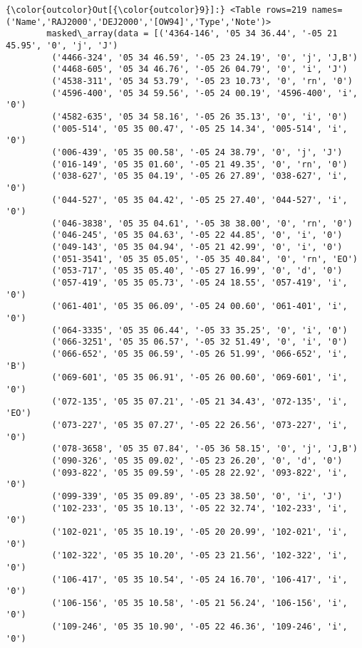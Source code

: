 \documentclass{article}
\begin{document}
            \begin{Verbatim}[commandchars=\\\{\}]
{\color{outcolor}Out[{\color{outcolor}9}]:} <Table rows=219 names=('Name','RAJ2000','DEJ2000','[OW94]','Type','Note')>
        masked\_array(data = [('4364-146', '05 34 36.44', '-05 21 45.95', '0', 'j', 'J')
         ('4466-324', '05 34 46.59', '-05 23 24.19', '0', 'j', 'J,B')
         ('4468-605', '05 34 46.76', '-05 26 04.79', '0', 'i', 'J')
         ('4538-311', '05 34 53.79', '-05 23 10.73', '0', 'rn', '0')
         ('4596-400', '05 34 59.56', '-05 24 00.19', '4596-400', 'i', '0')
         ('4582-635', '05 34 58.16', '-05 26 35.13', '0', 'i', '0')
         ('005-514', '05 35 00.47', '-05 25 14.34', '005-514', 'i', '0')
         ('006-439', '05 35 00.58', '-05 24 38.79', '0', 'j', 'J')
         ('016-149', '05 35 01.60', '-05 21 49.35', '0', 'rn', '0')
         ('038-627', '05 35 04.19', '-05 26 27.89', '038-627', 'i', '0')
         ('044-527', '05 35 04.42', '-05 25 27.40', '044-527', 'i', '0')
         ('046-3838', '05 35 04.61', '-05 38 38.00', '0', 'rn', '0')
         ('046-245', '05 35 04.63', '-05 22 44.85', '0', 'i', '0')
         ('049-143', '05 35 04.94', '-05 21 42.99', '0', 'i', '0')
         ('051-3541', '05 35 05.05', '-05 35 40.84', '0', 'rn', 'EO')
         ('053-717', '05 35 05.40', '-05 27 16.99', '0', 'd', '0')
         ('057-419', '05 35 05.73', '-05 24 18.55', '057-419', 'i', '0')
         ('061-401', '05 35 06.09', '-05 24 00.60', '061-401', 'i', '0')
         ('064-3335', '05 35 06.44', '-05 33 35.25', '0', 'i', '0')
         ('066-3251', '05 35 06.57', '-05 32 51.49', '0', 'i', '0')
         ('066-652', '05 35 06.59', '-05 26 51.99', '066-652', 'i', 'B')
         ('069-601', '05 35 06.91', '-05 26 00.60', '069-601', 'i', '0')
         ('072-135', '05 35 07.21', '-05 21 34.43', '072-135', 'i', 'EO')
         ('073-227', '05 35 07.27', '-05 22 26.56', '073-227', 'i', '0')
         ('078-3658', '05 35 07.84', '-05 36 58.15', '0', 'j', 'J,B')
         ('090-326', '05 35 09.02', '-05 23 26.20', '0', 'd', '0')
         ('093-822', '05 35 09.59', '-05 28 22.92', '093-822', 'i', '0')
         ('099-339', '05 35 09.89', '-05 23 38.50', '0', 'i', 'J')
         ('102-233', '05 35 10.13', '-05 22 32.74', '102-233', 'i', '0')
         ('102-021', '05 35 10.19', '-05 20 20.99', '102-021', 'i', '0')
         ('102-322', '05 35 10.20', '-05 23 21.56', '102-322', 'i', '0')
         ('106-417', '05 35 10.54', '-05 24 16.70', '106-417', 'i', '0')
         ('106-156', '05 35 10.58', '-05 21 56.24', '106-156', 'i', '0')
         ('109-246', '05 35 10.90', '-05 22 46.36', '109-246', 'i', '0')

\end{Verbatim}
\end{document}
